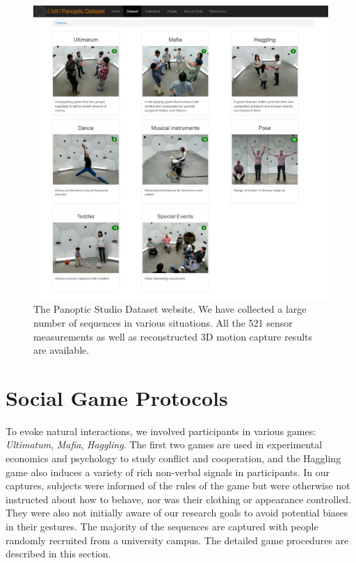\begin{figure}
	\centering
	\includegraphics[height=0.95\textwidth]{figures/domedb}
	\caption{The Panoptic Studio Dataset website. We have collected a large number of sequences in various situations. All the 521 sensor measurements as well as reconstructed 3D motion capture results are available.} 
	\label{fig:domedb}
\end{figure}

\section{Social Game Protocols}
To evoke natural interactions, we involved participants in various games: \emph{Ultimatum}, \emph{Mafia}, \emph{Haggling}. The first two games are used in experimental economics and psychology to study conflict and cooperation, and the Haggling game also induces a variety of rich non-verbal signals in participants. In our captures, subjects were informed of the rules of the game but were otherwise not instructed about how to behave, nor was their clothing or appearance controlled. They were also not initially aware of our research goals to avoid potential biases in their gestures. The majority of the sequences are captured with people randomly recruited from a university campus. The detailed game procedures are described in this section.

